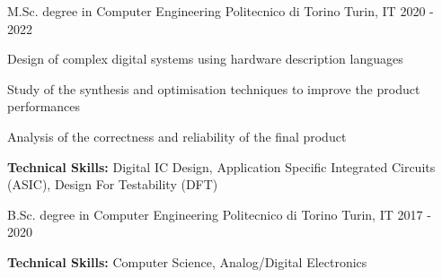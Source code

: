 

\begin{cventries}

  \cventry
    {M.Sc. degree in Computer Engineering} %
    {Politecnico di Torino} %
    {Turin, IT} %
    {2020 - 2022} %
    {
      \begin{cvitems} %
        \item {Design of complex digital systems using hardware description languages}
        \item {Study of the synthesis and optimisation techniques to improve the product performances}
        \item {Analysis of the correctness and reliability of the final product}
        \item {\textbf{Technical Skills:} Digital IC Design, Application Specific Integrated Circuits (ASIC), Design For Testability (DFT)}
      \end{cvitems}
    }
    
  \cventry
    {B.Sc. degree in Computer Engineering} %
    {Politecnico di Torino} %
    {Turin, IT} %
    {2017 - 2020} %
    {
      \begin{cvitems} %
        \item {\textbf{Technical Skills:} Computer Science, Analog/Digital Electronics}
      \end{cvitems}
    }
    
\end{cventries}

